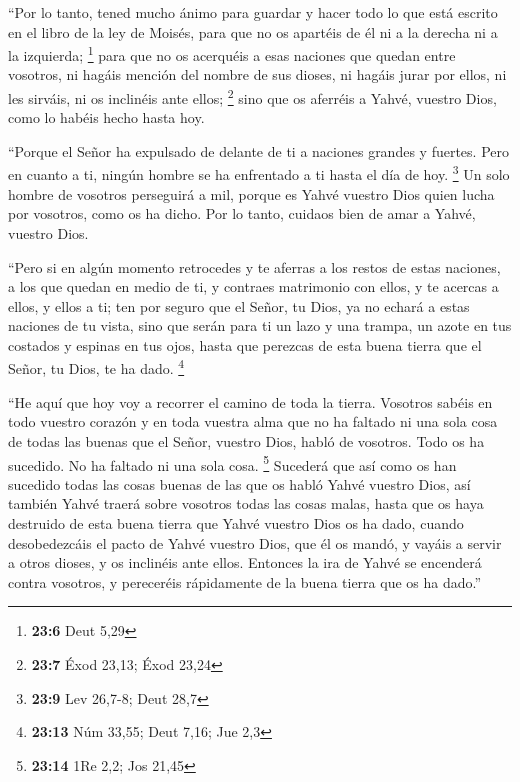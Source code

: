 \begin{paracol}{2}
 ``Por lo tanto, tened mucho ánimo para guardar y hacer
todo lo que está escrito en el libro de la ley de Moisés, para que no os
apartéis de él ni a la derecha ni a la izquierda; \footnote{\textbf{23:6}
  Deut 5,29}  para que no os acerquéis a esas naciones que
quedan entre vosotros, ni hagáis mención del nombre de sus dioses, ni
hagáis jurar por ellos, ni les sirváis, ni os inclinéis ante ellos;
\footnote{\textbf{23:7} Éxod 23,13; Éxod 23,24}  sino que
os aferréis a Yahvé, vuestro Dios, como lo habéis hecho hasta hoy.

 ``Porque el Señor ha expulsado de delante de ti a
naciones grandes y fuertes. Pero en cuanto a ti, ningún hombre se ha
enfrentado a ti hasta el día de hoy. \footnote{\textbf{23:9} Lev 26,7-8;
  Deut 28,7}  Un solo hombre de vosotros perseguirá a
mil, porque es Yahvé vuestro Dios quien lucha por vosotros, como os ha
dicho.  Por lo tanto, cuidaos bien de amar a Yahvé,
vuestro Dios.

 ``Pero si en algún momento retrocedes y te aferras a los
restos de estas naciones, a los que quedan en medio de ti, y contraes
matrimonio con ellos, y te acercas a ellos, y ellos a ti;
 ten por seguro que el Señor, tu Dios, ya no echará a
estas naciones de tu vista, sino que serán para ti un lazo y una trampa,
un azote en tus costados y espinas en tus ojos, hasta que perezcas de
esta buena tierra que el Señor, tu Dios, te ha dado. \footnote{\textbf{23:13}
  Núm 33,55; Deut 7,16; Jue 2,3}

 ``He aquí que hoy voy a recorrer el camino de toda la
tierra. Vosotros sabéis en todo vuestro corazón y en toda vuestra alma
que no ha faltado ni una sola cosa de todas las buenas que el Señor,
vuestro Dios, habló de vosotros. Todo os ha sucedido. No ha faltado ni
una sola cosa. \footnote{\textbf{23:14} 1Re 2,2; Jos 21,45}
 Sucederá que así como os han sucedido todas las cosas
buenas de las que os habló Yahvé vuestro Dios, así también Yahvé traerá
sobre vosotros todas las cosas malas, hasta que os haya destruido de
esta buena tierra que Yahvé vuestro Dios os ha dado, 
cuando desobedezcáis el pacto de Yahvé vuestro Dios, que él os mandó, y
vayáis a servir a otros dioses, y os inclinéis ante ellos. Entonces la
ira de Yahvé se encenderá contra vosotros, y pereceréis rápidamente de
la buena tierra que os ha dado.''

\switchcolumn
\begin{otherlanguage}{english}


\end{otherlanguage}
\end{paracol}
